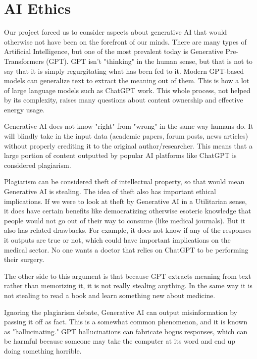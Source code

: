 \documentclass[letterpaper,11pt,leqno]{article}
\begin{document}
\section{AI Ethics}

Our project forced us to consider aspects about generative AI that would otherwise not have been on the forefront of our minds. There are many types of Artificial Intelligence, but one of the most prevalent today is Generative Pre-Transformers (GPT). GPT isn't "thinking" in the human sense, but that is not to say that it is simply regurgitating what has been fed to it. Modern GPT-based models can generalize text to extract the meaning out of them. This is how a lot of large language models such as ChatGPT work. This whole process, not helped by its complexity, raises many questions about content ownership and effective energy usage. 

Generative AI does not know "right" from "wrong" in the same way humans do. It will blindly take in the input data (academic papers, forum posts, news articles) without properly crediting it to the original author/researcher. This means that a large portion of content outputted by popular AI platforms like ChatGPT is considered plagiarism. 

Plagiarism can be considered theft of intellectual property, so that would mean Generative AI is stealing. The idea of theft also has important ethical implications. If we were to look at theft by Generative AI in a Utilitarian sense, it does have certain benefits like democratizing otherwise esoteric knowledge that people would not go out of their way to consume (like medical journals). But it also has related drawbacks. For example, it does not know if any of the responses it outputs are true or not, which could have important implications on the medical sector. No one wants a doctor that relies on ChatGPT to be performing their surgery. 

The other side to this argument is that because GPT extracts meaning from text rather than memorizing it, it is not really stealing anything. In the same way it is not stealing to read a book and learn something new about medicine. 

Ignoring the plagiarism debate, Generative AI can output misinformation by passing it off as fact. This is a somewhat common phenomenon, and it is known as "hallucinating." GPT hallucinations can fabricate bogus responses, which can be harmful because someone may take the computer at its word and end up doing something horrible. 
\end{document}
